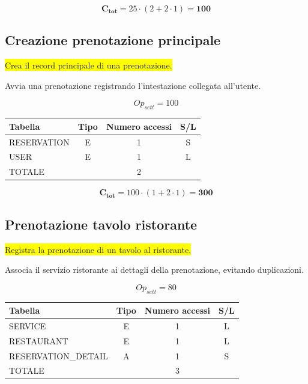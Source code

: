 \documentclass[a4paper,12pt]{report}
\begin{document}
$$\mathbf{C_{tot}} = 25 \cdot (2 + 2 \cdot 1) = \mathbf{100}$$

\subsection*{Creazione prenotazione principale} \label{op13}
\colorbox{yellow}{Crea il record principale di una prenotazione.}

Avvia una prenotazione registrando l'intestazione collegata all'utente.

$$Op_{sett} = 100$$

\begin{table}[H]
  \centering
  \small
  \renewcommand{\arraystretch}{1.15}
  \begin{tabularx}{0.8\textwidth}{|X|c|c|c|}
    \hline
    \rowcolor{gray!20}
    \textbf{Tabella} & \textbf{Tipo} & \textbf{Numero accessi} & \textbf{S/L} \\
    \hline
    RESERVATION & E & 1 & S \\
    USER & E & 1 & L \\
    \hline
    \rowcolor{gray!20}
    TOTALE & & 2 & \\
    \hline
  \end{tabularx}
  \vspace{-1em}
\end{table}

$$\mathbf{C_{tot}} = 100 \cdot (1 + 2 \cdot 1) = \mathbf{300}$$

\subsection*{Prenotazione tavolo ristorante} \label{op14}
\colorbox{yellow}{Registra la prenotazione di un tavolo al ristorante.}

Associa il servizio ristorante ai dettagli della prenotazione,
evitando duplicazioni.

$$Op_{sett} = 80$$

\begin{table}[H]
  \centering
  \small
  \renewcommand{\arraystretch}{1.15}
  \begin{tabularx}{0.8\textwidth}{|X|c|c|c|}
    \hline
    \rowcolor{gray!20}
    \textbf{Tabella} & \textbf{Tipo} & \textbf{Numero accessi} & \textbf{S/L} \\
    \hline
    SERVICE & E & 1 & L \\
    RESTAURANT & E & 1 & L \\
    RESERVATION\_DETAIL & A & 1 & S \\
    \hline
    \rowcolor{gray!20}
    TOTALE & & 3 & \\
    \hline
  \end{tabularx}
  \vspace{-1em}
\end{table}
\end{document}
